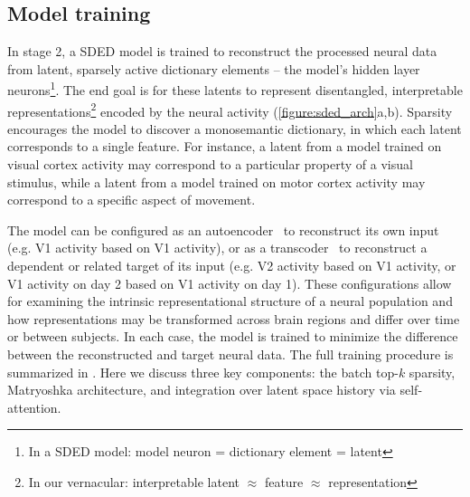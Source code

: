 \subsection{Model training}

In stage 2, a SDED model is trained to reconstruct the processed neural data from latent, sparsely active dictionary elements -- the model's hidden layer neurons\footnote{In a SDED model: model neuron = dictionary element = latent}. The end goal is for these latents to represent disentangled, interpretable representations\footnote{In our vernacular: interpretable latent $\approx$ feature $\approx$ representation} encoded by the neural activity (\autoref{figure:sded_arch}a,b). Sparsity encourages the model to discover a monosemantic dictionary, in which each latent corresponds to a single feature. For instance, a latent from a model trained on visual cortex activity may correspond to a particular property of a visual stimulus, while a latent from a model trained on motor cortex activity may correspond to a specific aspect of movement.

The model can be configured as an autoencoder~\cite{cunningham_2023_saes} to reconstruct its own input (e.g. V1 activity based on V1 activity), or as a transcoder~\cite{ dunefsky_2024_transcoders} to reconstruct a dependent or related target of its input (e.g. V2 activity based on V1 activity, or V1 activity on day 2 based on V1 activity on day 1). These configurations allow for examining the intrinsic representational structure of a neural population and how representations may be transformed across brain regions and differ over time or between subjects. In each case, the model is trained to minimize the difference between the reconstructed and target neural data. The full training procedure is summarized in . Here we discuss three key components: the batch top-$k$ sparsity, Matryoshka architecture, and integration over latent space history via self-attention.

